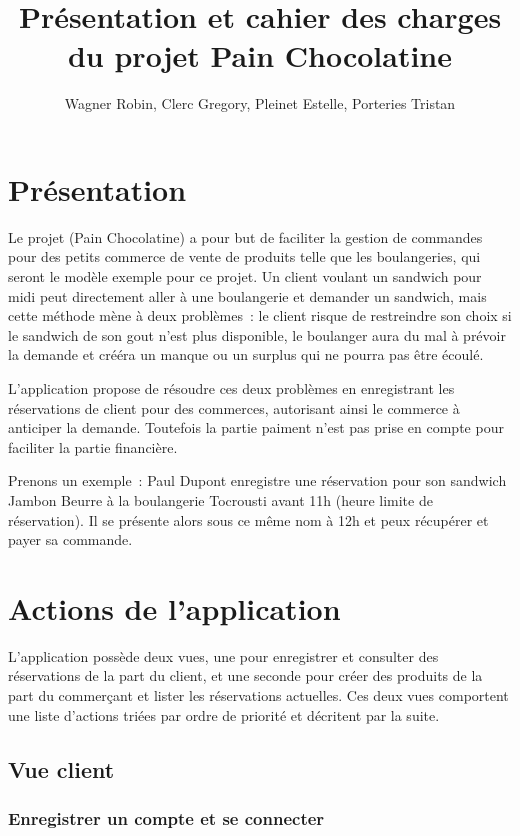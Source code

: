 \documentclass[a4paper,12pt]{article}
\title{Présentation et cahier des charges du projet Pain Chocolatine}
\author{Wagner Robin, Clerc Gregory, Pleinet Estelle, Porteries Tristan}
\begin{document}
\maketitle

\tableofcontents

\section{Présentation}

Le projet (Pain Chocolatine) a pour but de faciliter la gestion de commandes pour des petits commerce de vente de produits telle que les boulangeries, qui seront le modèle exemple pour ce projet.
Un client voulant un sandwich pour midi peut directement aller à une boulangerie et demander un sandwich, mais cette méthode mène à deux problèmes~: le client risque de restreindre son choix si le sandwich de son gout n'est plus disponible, le boulanger aura du mal à prévoir la demande et crééra un manque ou un surplus qui ne pourra pas être écoulé.

L'application propose de résoudre ces deux problèmes en enregistrant les réservations de client pour des commerces, autorisant ainsi le commerce à anticiper la demande. Toutefois la partie paiment n'est pas prise en compte pour faciliter la partie financière.

Prenons un exemple~: Paul Dupont enregistre une réservation pour son sandwich Jambon Beurre à la boulangerie Tocrousti avant 11h (heure limite de réservation). Il se présente alors sous ce même nom à 12h et peux récupérer et payer sa commande.

\section{Actions de l'application}

L'application possède deux vues, une pour enregistrer et consulter des réservations de la part du client, et une seconde pour créer des produits de la part du commerçant et lister les réservations actuelles. Ces deux vues comportent une liste d'actions triées par ordre de priorité et décritent par la suite.

\subsection{Vue client}

\subsubsection{Enregistrer un compte et se connecter}
\end{document}
